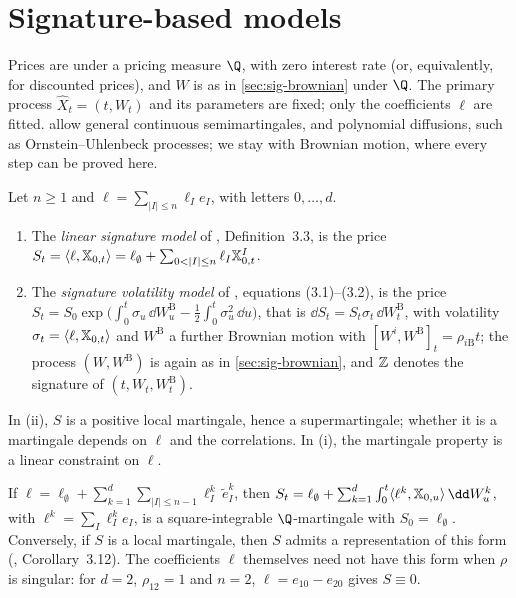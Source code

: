 \section{Signature-based models}\label{sec:sig-models}

Prices are under a pricing measure $\Q$, with zero interest rate (or, equivalently, for discounted
prices), and $W$ is as in \cref{sec:sig-brownian} under $\Q$. The primary process
$\widehat X_t=(t,W_t)$ and its parameters are fixed; only the coefficients $\ell$ are fitted.
\textcite{cuchiero-gazzani-svaluto-ferro-2023} allow general continuous semimartingales, and
\textcite{cuchiero-gazzani-moller-svaluto-ferro-2025} polynomial diffusions, such as Ornstein--Uhlenbeck processes; we
stay with Brownian motion, where every step can be proved here.

\begin{definition}\label{def:sig-model}
Let $n\ge1$ and $\ell=\sum_{|I|\le n}\ell_Ie_I$, with letters $0,\dots,d$.
\begin{enumerate}[label=(\roman*)]
  \item The \emph{linear signature model} of \textcite{cuchiero-gazzani-svaluto-ferro-2023}, Definition~3.3, is the
    price $S_t=\langle\ell,\sigX_{0,t}\rangle=\ell_\emptyset+\sum_{0<|I|\le n}\ell_I\sigX^I_{0,t}$.
  \item The \emph{signature volatility model} of \textcite{cuchiero-gazzani-moller-svaluto-ferro-2025}, equations
    (3.1)--(3.2), is the price $S_t=S_0\exp\big(\int_0^t\sigma_u\,\dd W^{\mathrm B}_u-\frac12\int_0^t\sigma_u^2\,\dd u\big)$, that
    is $\dd S_t=S_t\sigma_t\,\dd W^{\mathrm B}_t$, with volatility $\sigma_t=\langle\ell,\mathbb X_{0,t}\rangle$ and
    $W^{\mathrm B}$ a further Brownian motion with $[W^i,W^{\mathrm B}]_t=\rho_{i\mathrm B}t$; the process
    $(W,W^{\mathrm B})$ is again as in \cref{sec:sig-brownian}, and $\mathbb Z$ denotes the signature of
    $(t,W_t,W^{\mathrm B}_t)$.
\end{enumerate}
\end{definition}

In (ii), $S$ is a positive local martingale, hence a supermartingale; whether it is a martingale depends on
$\ell$ and the correlations. In (i), the martingale property is a linear constraint on $\ell$.

\begin{proposition}\label{prop:sig-martingale}
If $\ell=\ell_\emptyset+\sum_{k=1}^d\sum_{|I|\le n-1}\ell^k_I\,\tilde e^k_I$, then
$S_t=\ell_\emptyset+\sum_{k=1}^d\int_0^t\langle\ell^k,\sigX_{0,u}\rangle\,\dd W^k_u$, with $\ell^k=\sum_I\ell^k_Ie_I$, is a
square-integrable $\Q$-martingale with $S_0=\ell_\emptyset$. Conversely, if $S$ is a local martingale, then $S$ admits a
representation of this form (\textcite{cuchiero-gazzani-svaluto-ferro-2023}, Corollary~3.12). The coefficients $\ell$
themselves need not have this form when $\rho$ is singular: for $d=2$, $\rho_{12}=1$ and $n=2$, $\ell=e_{10}-e_{20}$ gives
$S\equiv0$.
\end{proposition}


